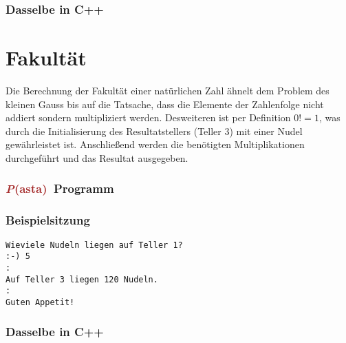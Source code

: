 \documentclass[11pt]{book}
\newcommand{\Pasta}{\textcolor{brown}{{\bf \em P}{\scriptsize{(asta)}}}}
\begin{document}
\subsubsection{Dasselbe in C++}



\section{Fakult\"at}

Die Berechnung der Fakult\"at einer nat\"urlichen Zahl
\"ahnelt dem Problem des kleinen Gauss bis auf die Tatsache,
dass die Elemente der Zahlenfolge nicht addiert sondern multipliziert
werden. Desweiteren ist per Definition $0!=1$, was durch die 
Initialisierung des Resultatstellers (Teller 3) mit einer Nudel
gew\"ahrleistet ist. Anschlie\ss end werden die ben\"otigten
Multiplikationen durchgef\"uhrt und das Resultat ausgegeben.

\subsubsection{\Pasta\ Programm}
\color{blue}

\color{black}
\subsubsection{Beispielsitzung}
\color{purple}

\begin{lstlisting}
Wieviele Nudeln liegen auf Teller 1?
:-) 5
:
Auf Teller 3 liegen 120 Nudeln.
:
Guten Appetit!
\end{lstlisting}
\color{black}

\subsubsection{Dasselbe in C++}


\end{document}
